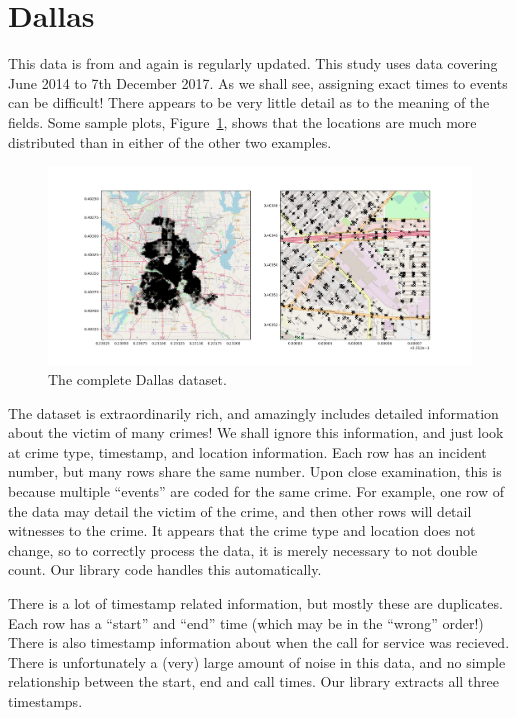 \documentclass[twoside,a4paper,twocolumn,10pt]{article}
\theoremstyle{plain}
\theoremstyle{definition}
\begin{document}
\section{Dallas}

This data is from \cite{ddata} and again is regularly updated.  This study uses data
covering June 2014 to 7th December 2017.  As we shall see, assigning exact
times to events can be difficult!  There appears to be very
little detail as to the meaning of the fields.  Some sample plots, Figure~\ref{fig:dallas},
shows that the locations are much more distributed than in either of the other two examples.

\begin{figure}
  \includegraphics[width=\textwidth]{Dallas_overview.png}
  \caption{The complete Dallas dataset.}
  \label{fig:dallas}
\end{figure}

The dataset is extraordinarily rich, and amazingly includes detailed information about the victim
of many crimes!  We shall ignore this information, and just look at crime type, timestamp, and
location information.  Each row has an incident number, but many rows share the same number.
Upon close examination, this is because multiple ``events'' are coded for the same crime.  For example,
one row of the data may detail the victim of the crime, and then other rows will detail witnesses
to the crime.  It appears that the crime type and location does not change, so to correctly
process the data, it is merely necessary to not double count.  Our library code handles
this automatically.

There is a lot of timestamp related information, but mostly these are duplicates.  Each row has a
``start'' and ``end'' time (which may be in the ``wrong'' order!)  There is also timestamp information
about when the call for service was recieved.  There is unfortunately a (very) large amount of noise
in this data, and no simple relationship between the start, end and call times.  Our library extracts all
three timestamps.
\end{document}
